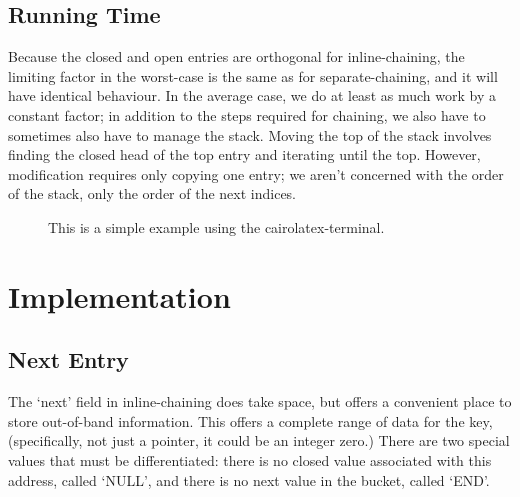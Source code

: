 \documentclass[12pt]{article}
\begin{document}
\subsection{Running Time}

Because the closed and open entries are orthogonal for inline-chaining, the limiting factor in the worst-case is the same as for separate-chaining, and it will have identical behaviour. In the average case, we do at least as much work by a constant factor; in addition to the steps required for chaining, we also have to sometimes also have to manage the stack. Moving the top of the stack involves finding the closed head of the top entry and iterating until the top. However, modification requires only copying one entry; we aren't concerned with the order of the stack, only the order of the next indices.

\begin{figure}%
\centering%
\caption{This is a simple example using the cairolatex-terminal.}%
\label{pic:cairolatex}%
\end{figure}%

\section{Implementation}

\subsection{Next Entry}

The `next' field in inline-chaining does take space, but offers a convenient place to store out-of-band information. This offers a complete range of data for the key, (specifically, not just a pointer, it could be an integer zero.) There are two special values that must be differentiated: there is no closed value associated with this address, called `NULL', and there is no next value in the bucket, called `END'.
\end{document}
